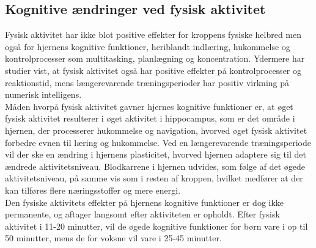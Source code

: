 \subsection{Kognitive ændringer ved fysisk aktivitet}

Fysisk aktivitet har ikke blot positive effekter for kroppens fysiske helbred men også for hjernens kognitive funktioner, heriblandt indlæring, hukommelse og kontrolprocesser som multitasking, planlægning og koncentration\citep{Berchtold2010,Schmidt2015}. Ydermere har studier vist, at fysisk aktivitet også har positive effekter på kontrolprocesser og reaktionstid, mens længerevarende træningsperioder har positiv virkning på numerisk intelligens\citep{Bugge2015,Berchtold2010,Schmidt2015}.\\
Måden hvorpå fysisk aktivitet gavner hjernes kognitive funktioner er, at øget fysisk aktivitet resulterer i øget aktivitet i hippocampus, som er det område i hjernen, der processerer hukommelse og navigation, hvorved øget fysisk aktivitet forbedre evnen til læring og hukommelse. Ved en længerevarende træningsperiode vil der ske en ændring i hjernens plasticitet, hvorved hjernen adaptere sig til det ændrede aktivitetsniveau. Blodkarrene i hjernen udvides, som følge af det øgede aktivitetsniveau, på samme vis som i resten af kroppen, hvilket medfører at der kan tilføres flere næringsstoffer og mere energi.\citep{Cotman2007}\\
Den fysiske aktivitets effekter på hjernens kognitive funktioner er dog ikke permanente, og aftager langsomt efter aktiviteten er opholdt. Efter fysisk aktivitet i 11-20 minutter, vil de øgede kognitive funktioner for børn vare i op til 50 minutter, mens de for voksne vil vare i 25-45 minutter.\citep{Cotman2007}



